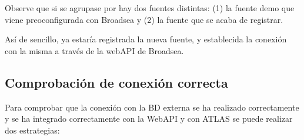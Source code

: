 \begin{enumerate}
    Observe que si se agrupase por  hay dos fuentes distintas: (1) la fuente demo que viene preoconfigurada con Broadsea y (2) la fuente que se acaba de registrar.

\end{enumerate}

Así de sencillo, ya estaría registrada la nueva fuente, y establecida la conexión con la misma a través de la webAPI de Broadsea.

\subsection{Comprobación de conexión correcta} \label{subsec:04comprobacion}

Para comprobar que la conexión con la BD externa se ha realizado correctamente y se ha integrado correctamente con la WebAPI y con ATLAS se puede realizar dos estrategias:

